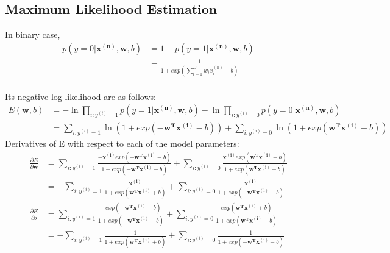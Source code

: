 \documentclass{article}
\begin{document}

\subsection{Maximum Likelihood Estimation}
In binary case,
  \[
  \begin{aligned}
  p(y=0|\bm{x^{(n)},w},b)&=1-p(y=1|\bm{x^{(n)},w},b)\\
  &=\frac{1}{1+exp(\sum_{i=1}^{D}w_ix_i^{(n)}+b)}\\  
  \end{aligned}
  \]
  
Its negative log-likelihood are as follows:
  \[
  \begin{aligned}
  E(\bm{w},b)&=-\ln\prod_{i:y^{(i)}=1}p(y=1|\bm{x^{(n)},w},b)-\ln\prod_{i:y^{(i)}=0}p(y=0|\bm{x^{(n)},w},b)\\
  &=\sum_{i:y^{(i)}=1}\ln(1+exp(-\bm{w^Tx^{(i)}}-b))+\sum_{i:y^{(i)}=0}\ln(1+exp(\bm{w^Tx^{(i)}}+b))
  \end{aligned}
  \]
  Derivatives of E with respect to each of the model parameters:
  \[
  \begin{aligned}
  \frac{\partial{E}}{\partial\bm{w}}&=\sum_{i:y^{(i)}=1}\frac{-\bm{x^{(i)}}exp(-\bm{w^Tx^{(i)}}-b)}{1+exp(-\bm{w^Tx^{(i)}}-b)}+
  \sum_{i:y^{(i)}=0}\frac{\bm{x^{(i)}}exp(\bm{w^Tx^{(i)}}+b)}{1+exp(\bm{w^Tx^{(i)}}+b)}\\
  &=-\sum_{i:y^{(i)}=1}\frac{\bm{x^{(i)}}}{1+exp(\bm{w^Tx^{(i)}}+b)}+
  \sum_{i:y^{(i)}=0}\frac{\bm{x^{(i)}}}{1+exp(-\bm{w^Tx^{(i)}}-b)}\\
  \frac{\partial{E}}{\partial{b}}&=\sum_{i:y^{(i)}=1}\frac{-exp(-\bm{w^Tx^{(i)}}-b)}{1+exp(-\bm{w^Tx^{(i)}}-b)}+
  \sum_{i:y^{(i)}=0}\frac{exp(\bm{w^Tx^{(i)}}+b)}{1+exp(\bm{w^Tx^{(i)}}+b)}\\
  &=-\sum_{i:y^{(i)}=1}\frac{1}{1+exp(\bm{w^Tx^{(i)}}+b)}+
  \sum_{i:y^{(i)}=0}\frac{1}{1+exp(-\bm{w^Tx^{(i)}}-b)}
  \end{aligned}
  \]
\end{document}
